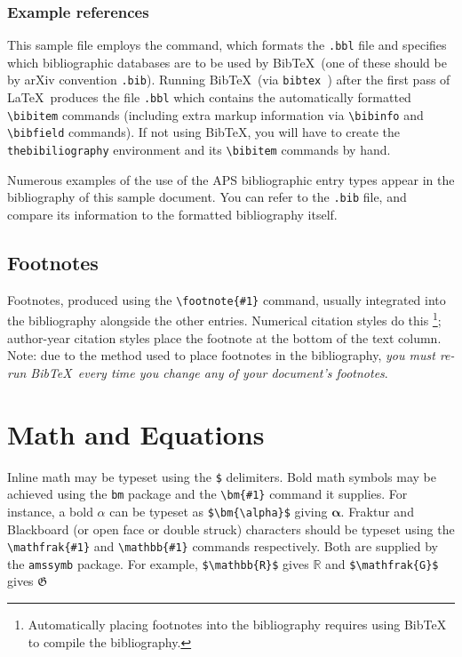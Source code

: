\documentclass[%
 reprint,
 amsmath,amssymb,
 aps,
]{revtex4-2}
\begin{document}
\subsubsection{Example references}
This sample file employs the \verb++ command, 
which formats the \texttt{\jobname .bbl} file
and specifies which bibliographic databases are to be used by Bib\TeX\ 
(one of these should be by arXiv convention \texttt{\jobname .bib}).
Running Bib\TeX\ (via \texttt{bibtex \jobname}) 
after the first pass of \LaTeX\ produces the file
\texttt{\jobname .bbl} which contains the automatically formatted
\verb+\bibitem+ commands (including extra markup information via
\verb+\bibinfo+ and \verb+\bibfield+ commands). 
If not using Bib\TeX, you will have to create the \verb+thebibiliography+ environment 
and its \verb+\bibitem+ commands by hand.

Numerous examples of the use of the APS bibliographic entry types appear in the bibliography of this sample document.
You can refer to the \texttt{\jobname .bib} file, 
and compare its information to the formatted bibliography itself.

\subsection{Footnotes}%
Footnotes, produced using the \verb+\footnote{#1}+ command, 
usually integrated into the bibliography alongside the other entries.
Numerical citation styles do this%
\footnote{Automatically placing footnotes into the bibliography requires using BibTeX to compile the bibliography.};
author-year citation styles place the footnote at the bottom of the text column.
Note: due to the method used to place footnotes in the bibliography, 
\emph{you must re-run Bib\TeX\ every time you change any of your document's footnotes}. 

\section{Math and Equations}
Inline math may be typeset using the \verb+$+ delimiters. Bold math
symbols may be achieved using the \verb+bm+ package and the
\verb+\bm{#1}+ command it supplies. For instance, a bold $\alpha$ can
be typeset as \verb+$\bm{\alpha}$+ giving $\bm{\alpha}$. Fraktur and
Blackboard (or open face or double struck) characters should be
typeset using the \verb+\mathfrak{#1}+ and \verb+\mathbb{#1}+ commands
respectively. Both are supplied by the \texttt{amssymb} package. For
example, \verb+$\mathbb{R}$+ gives $\mathbb{R}$ and
\verb+$\mathfrak{G}$+ gives $\mathfrak{G}$
\end{document}
